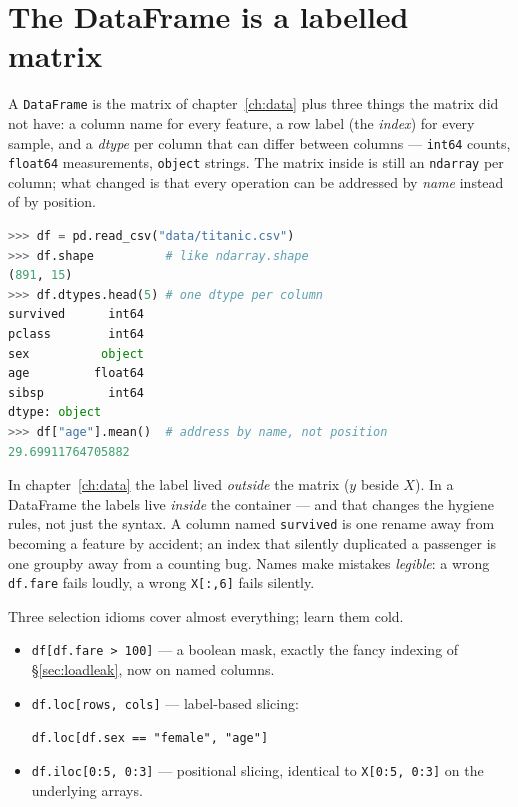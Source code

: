 \section{The DataFrame is a labelled matrix}\label{sec:dataframe}

A \texttt{DataFrame} is the matrix of
chapter~\ref{ch:data} plus three things the matrix did not have: a column
name for every feature, a row label (the \emph{index}) for every sample, and
a \emph{dtype} per column that can differ between columns --- \texttt{int64}
counts, \texttt{float64} measurements, \texttt{object} strings. The matrix
inside is still an \texttt{ndarray} per column; what changed is that every
operation can be addressed by \emph{name} instead of by position.

\begin{lstlisting}[language=Python,numbers=none]
>>> df = pd.read_csv("data/titanic.csv")
>>> df.shape          # like ndarray.shape
(891, 15)
>>> df.dtypes.head(5) # one dtype per column
survived      int64
pclass        int64
sex          object
age         float64
sibsp         int64
dtype: object
>>> df["age"].mean()  # address by name, not position
29.69911764705882
\end{lstlisting}

\begin{principle}
In chapter~\ref{ch:data} the label lived \emph{outside} the matrix ($y$
beside $X$). In a DataFrame the labels live \emph{inside} the container ---
and that changes the hygiene rules, not just the syntax. A column named
\texttt{survived} is one rename away from becoming a feature by accident;
an index that silently duplicated a passenger is one groupby away from a
counting bug. Names make mistakes \emph{legible}: a wrong \texttt{df.fare}
fails loudly, a wrong \texttt{X[:,6]} fails silently.
\end{principle}

Three selection idioms cover almost everything; learn them cold.

\begin{itemize}
\item \texttt{df[df.fare > 100]} --- a boolean mask, exactly the fancy
  indexing of \S\ref{sec:loadleak}, now on named columns.
\item \texttt{df.loc[rows, cols]} --- label-based slicing:
  \par\texttt{df.loc[df.sex == "female", "age"]}
\item \texttt{df.iloc[0:5, 0:3]} --- positional slicing, identical to
  \texttt{X[0:5, 0:3]} on the underlying arrays.
\end{itemize}


